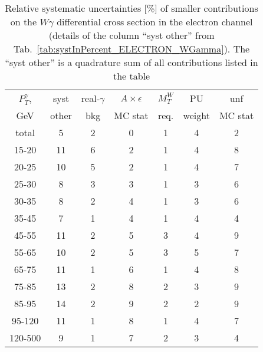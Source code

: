 \begin{table}[h]
  \scriptsize
  \begin{center}
  \caption{Relative systematic uncertainties [\%] of smaller contributions  on the $W\gamma$ differential cross section in the electron channel (details of the column ``syst other'' from Tab.~\ref{tab:systInPercent_ELECTRON_WGamma}). The ``syst other'' is a quadrature sum of all contributions listed in the table}
  \begin{tabular}{|c|c|c|c|c|c|c|}
    \hline
    $P_T^{\gamma}$,  & syst & real-$\gamma$ & $A\times\epsilon$ & $M_T^W$ & PU & unf\\
    GeV  & other & bkg & MC stat & req. & weight & MC stat\\ \hline
    total  & 5 & 2 & 0 & 1 & 4 & 2 \\ \hline
    15-20 & 11 & 6 & 2 & 1 & 4 & 8 \\ \hline
    20-25 & 10 & 5 & 2 & 1 & 4 & 7 \\ \hline
    25-30 & 8 & 3 & 3 & 1 & 3 & 6 \\ \hline
    30-35 & 8 & 2 & 4 & 1 & 3 & 6 \\ \hline
    35-45 & 7 & 1 & 4 & 1 & 4 & 4 \\ \hline
    45-55 & 11 & 2 & 5 & 3 & 4 & 9 \\ \hline
    55-65 & 10 & 2 & 5 & 3 & 5 & 7 \\ \hline
    65-75 & 11 & 1 & 6 & 1 & 4 & 8 \\ \hline
    75-85 & 13 & 2 & 8 & 2 & 3 & 9 \\ \hline
    85-95 & 14 & 2 & 9 & 2 & 2 & 9 \\ \hline
    95-120 & 11 & 1 & 8 & 1 & 4 & 7 \\ \hline
    120-500 & 9 & 1 & 7 & 2 & 3 & 4 \\ \hline
  \end{tabular}
  \label{tab:systInPercentSmallSysts_ELECTRON_WGamma}
  \end{center}
\end{table}
